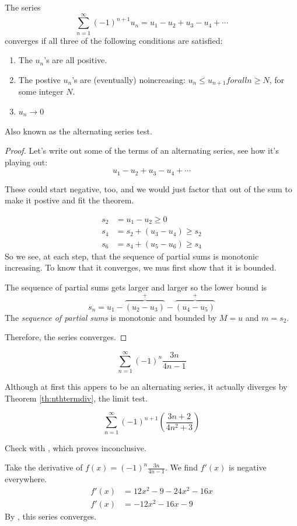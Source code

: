 \begin{theorem}\label{th:alternatingseries}\cite[p.~568]{thomas}
  The series
  \[ \sum^\infty_{n=1} (-1)^{n+1} u_n = u_1 - u_2 + u_3 - u_4 + \cdots \]
  converges if all three of the following conditions are satisfied:
  \begin{enumerate}
    \item The $u_n$'s are all positive.
    \item The postive $u_n$'s are (eventually) noincreasing: $u_n \leq u_{n+1}
      for all n \geq N$, for some integer $N$.
    \item $u_n \to 0$
  \end{enumerate}
  \begin{note}
    Also known as the alternating series test.
  \end{note}
\end{theorem}
\begin{proof}
  Let's write out some of the terms of an alternating series, see how it's
  playing out:
  \[ u_1 - u_2 + u_3 - u_4 + \cdots\]
  \begin{remark}
    These could start negative, too, and we would just factor that out of the sum
    to make it postive and fit the theorem.
  \end{remark}
  \begin{align*}
    s_2 &= u_1 - u_2 \geq 0 \\
    s_4 &= s_2 + (u_3 - u_4) \geq s_2 \\
    s_6 &= s_4 + (u_5 - u_6) \geq s_4
  \end{align*}
  So we see, at each step, that the sequence of partial sums is monotonic
  increasing. To know that it converges, we mus first show that it is bounded.

  The sequence of partial sums gets larger and larger so the lower bound is
  \[ s_n = u_1 - \overbrace{(u_2 - u_3)}^+ - \overbrace{(u_4 - u_5)}^+ \]
  The \emph{sequence of partial sums} is monotonic and bounded by $M=u$ and
  $m=s_2$.

  Therefore, the series converges.
\end{proof}
\begin{ex}
  \[ \sum^\infty_{n=1} (-1)^n \frac{3n}{4n-1} \]

  Although at first this appers to be an alternating series, it actually
  diverges by Theorem \ref{th:nthtermdiv}, the limit test.
\end{ex}
\begin{ex}
  \[ \sum^\infty_{n=1} (-1)^{n+1} \left( \frac{3n+2}{4n^2+3} \right) \]
  \begin{sol}
    Check with , which proves inconclusive.

    Take the derivative of $f(x)=(-1)^n \frac{3n}{4n-1}$. We find $f'(x)$ is
    negative everywhere.
    \begin{align*}
      f'(x)&=12x^2-9-24x^2-16x \\
      f'(x)&=-12x^2-16x-9
    \end{align*}
    By , this series converges.
  \end{sol}
\end{ex}

